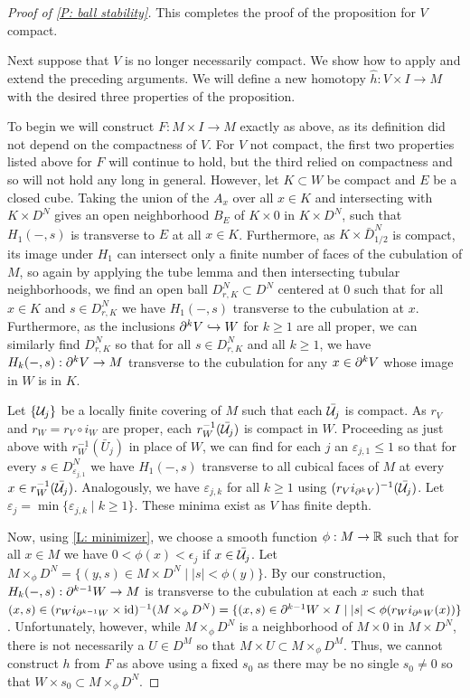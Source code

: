 \begin{proof}[Proof of \cref{P: ball stability}]
This completes the proof of the proposition for $V$ compact. 


Next suppose that $V$ is no longer necessarily compact. We show how to apply and extend the preceding arguments. We will define a new homotopy $\hat h:V\times I\to M$ with the desired three properties of the proposition. 

To begin we will construct $F:M\times I\to M$ exactly as above, as its definition did not depend on the compactness of $V$. For $V$ not compact, the first two properties listed above for $F$ will continue to hold, but the third relied on compactness and so will not hold any long in general. However, let 
$K\subset W$ be compact and $E$ be a closed cube. Taking the union of the $A_x$ over all $x\in K$ and intersecting with $K\times D^N$ gives an open neighborhood $B_E$ of $K\times 0$ in $K\times D^N$, such that 
 $H_1(-,s)$ is transverse to $E$ at all $x\in K$. 
Furthermore, as $K\times \bar D^N_{1/2}$ is compact, its image under $H_1$ can intersect only a finite number of faces of the cubulation of $M$, so again by applying the tube lemma and then intersecting tubular neighborhoods, we find an open ball $D_{r,K}^N\subset D^N$ centered at $0$ such that for all $x\in K$ and $s\in D_{r,K}^N$ we have $H_1(-,s)$ transverse to the cubulation at $x$. Furthermore, as the inclusions $\partial^kV\hookrightarrow W$ for $k\geq 1$ are all proper, we can similarly find  $D_{r,K}^N$  so that for all $s\in D_{r,K}^N$ and all $k\geq 1$, we have $H_k(-,s):\partial^kV\to M$ transverse to the cubulation for any $x\in \partial^{k}V$ whose image in $W$ is in $K$.

 Let $\{\mathcal{U}_j\}$ be a locally finite covering of $M$ such that each $\bar{\mathcal{U}_j}$ is compact. As $r_V$ and  $r_W=r_V\circ i_{W}$ are proper, each $r^{-1}_W(\bar {\mathcal{U}_j})$ is compact in $W$. Proceeding as just above with $r_W^{-1}(\bar U_j)$ in place of $W$, we can find for each $j$ an $\varepsilon_{j,1}\leq 1$ so that  for every $s\in D^N_{\varepsilon_{j,1}}$ we have $H_1(-,s)$  transverse to all cubical faces of $M$ at every  $x\in r^{-1}_W(\bar {\mathcal{U}_j})$. Analogously, we have $\varepsilon_{j,k}$ for all $k\geq 1$ using $(r_Vi_{\partial^kV})^{-1}(\bar {\mathcal{U}_j})$. Let $\varepsilon_j=\min\{\varepsilon_{j,k}\mid k\geq 1\}$. These minima exist as $V$ has finite depth. 

Now, using \cref{L: minimizer}, we choose  a smooth function $\phi:M\to \mathbb{R}$ such that for all $x\in M$ we have  $0<\phi(x)<\epsilon_j$ if $x\in \bar{\mathcal{U}_j}$. Let $M\times_\phi D^N=\{(y,s)\in M\times D^N\mid |s|<\phi(y)\}$. By our construction, $H_k(-,s):\partial^{k-1}W\to M$ is transverse to the cubulation at each $x$ such that $(x,s)\in(r_Wi_{\partial^{k-1}W}\times \mathrm{id})^{-1}(M\times_\phi D^N)=\{(x,s)\in \partial^{k-1}W\times I\mid |s|<\phi(r_Wi_{\partial^kW}(x))\}$. Unfortunately, however, while $M\times_\phi D^N$  is a neighborhood of $M\times 0$ in $M\times D^N$, there is not necessarily a $U\in D^M$ so that $M\times U\subset M\times_\phi D^M$. Thus,
we cannot construct $h$ from $F$ as above using a fixed $s_0$ as there may be no single $s_0\neq 0$ so that $W\times s_0\subset M\times_\phi D^N$.  



\end{proof}
